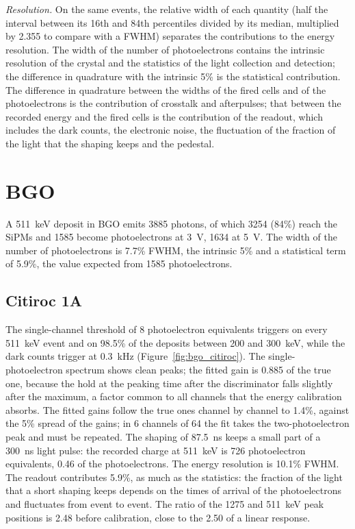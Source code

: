 \documentclass[11pt]{article}
\begin{document}
\emph{Resolution.} On the same events, the relative width of each quantity
(half the interval between its 16th and 84th percentiles divided by its
median, multiplied by 2.355 to compare with a FWHM) separates the
contributions to the energy resolution. The width of the number of
photoelectrons contains the intrinsic resolution of the crystal and the
statistics of the light collection and detection; the difference in
quadrature with the intrinsic 5\% is the statistical contribution. The
difference in quadrature between the widths of the fired cells and of the
photoelectrons is the contribution of crosstalk and afterpulses; that
between the recorded energy and the fired cells is the contribution of the
readout, which includes the dark counts, the electronic noise, the
fluctuation of the fraction of the light that the shaping keeps and the
pedestal.

\section{BGO}
\label{sec:bgo}

A 511~keV deposit in BGO emits 3885 photons, of which 3254 (84\%) reach the
SiPMs and 1585 become photoelectrons at 3~V, 1634 at 5~V. The width of the
number of photoelectrons is 7.7\% FWHM, the intrinsic 5\% and a
statistical term of 5.9\%, the value expected from 1585 photoelectrons.

\subsection{Citiroc 1A}

The single-channel threshold of 8 photoelectron equivalents triggers on
every 511~keV event and on 98.5\% of the deposits between 200 and
300~keV, while the dark counts trigger at 0.3~kHz
(Figure~\ref{fig:bgo_citiroc}). The single-photoelectron spectrum shows
clean peaks; the fitted gain is 0.885 of the true one, because the hold at
the peaking time after the discriminator falls slightly after the maximum,
a factor common to all channels that the energy calibration absorbs. The
fitted gains follow the true ones channel by channel to 1.4\%, against the
5\% spread of the gains; in 6 channels of 64 the fit takes the
two-photoelectron peak and must be repeated. The shaping of 87.5~ns keeps
a small part of a 300~ns light pulse: the recorded charge at 511~keV is
726 photoelectron equivalents, 0.46 of the photoelectrons. The energy
resolution is 10.1\% FWHM. The readout contributes 5.9\%, as much as the
statistics: the fraction of the light that a short shaping keeps depends
on the times of arrival of the photoelectrons and fluctuates from event to
event. The ratio of the 1275 and 511~keV peak positions is 2.48 before
calibration, close to the 2.50 of a linear response.
\end{document}
